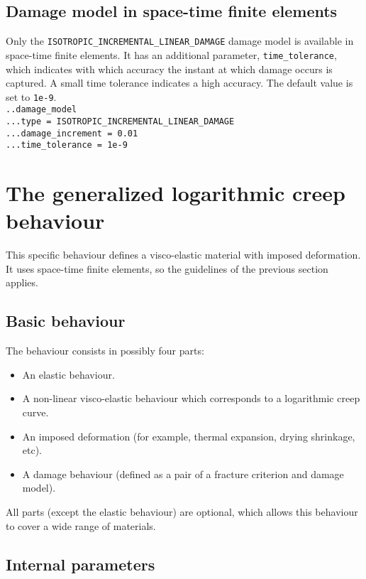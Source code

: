 \documentclass[10pt]{article}
\begin{document}
\subsection{Damage model in space-time finite elements}

Only the \verb+ISOTROPIC_INCREMENTAL_LINEAR_DAMAGE+ damage model is available in space-time finite elements. It has an additional parameter, \verb+time_tolerance+, which indicates with which accuracy the instant at which damage occurs is captured. A small time tolerance indicates a high accuracy. The default value is set to \verb+1e-9+.\\

\noindent \verb+..damage_model+\\
\verb+...type = ISOTROPIC_INCREMENTAL_LINEAR_DAMAGE+\\
\verb+...damage_increment = 0.01+\\
\verb+...time_tolerance = 1e-9+

\section{The generalized logarithmic creep behaviour}

This specific behaviour defines a visco-elastic material with imposed deformation. It uses space-time finite elements, so the guidelines of the previous section applies.

\subsection{Basic behaviour}

The behaviour consists in possibly four parts:

\begin{itemize}
	\item An elastic behaviour.
	\item A non-linear visco-elastic behaviour which corresponds to a logarithmic creep curve.
	\item An imposed deformation (for example, thermal expansion, drying shrinkage, etc).
	\item A damage behaviour (defined as a pair of a fracture criterion and damage model).
\end{itemize}

All parts (except the elastic behaviour) are optional, which allows this behaviour to cover a wide range of materials.

\subsection{Internal parameters}
\end{document}
